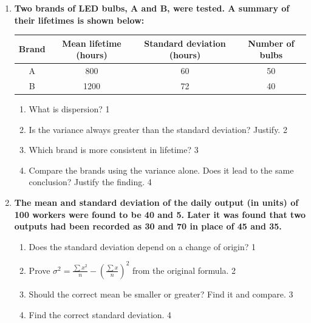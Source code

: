 \documentclass[a4paper,oneside]{book}
\begin{document}
\begin{enumerate}
  \begin{enumerate}
    \item  
	Find Mean Deviation about mean and median of the footballer A.  \hfill 3
    \item
	Which footballer should be hired a club? Determine with the help of a suitable relative measure of dispersion. \hfill 4
\end{enumerate}

\item
\textbf{Two brands of LED bulbs, A and B, were tested. A summary of their lifetimes is shown below:}
\begin{center}
\begin{tabular}{c|c|c|c}
Brand & Mean lifetime (hours) & Standard deviation (hours) & Number of bulbs \\ \hline
A & 800 & 60 & 50 \\
B & 1200 & 72 & 40
\end{tabular}
\end{center}
\begin{enumerate}
  \item What is dispersion? \hfill 1
  \item Is the variance always greater than the standard deviation? Justify. \hfill 2
  \item Which brand is more consistent in lifetime? \hfill 3
  \item Compare the brands using the variance alone. Does it lead to the same conclusion? Justify the finding. \hfill 4
\end{enumerate}

\item
\textbf{The mean and standard deviation of the daily output (in units) of 100 workers were found to be 40 and 5. Later it was found that two outputs had been recorded as 30 and 70 in place of 45 and 35.}

\begin{enumerate}
  \item Does the standard deviation depend on a change of origin? \hfill 1
  \item Prove $\displaystyle \sigma^2 = \frac{\sum x^2}{n} - \left(\frac{\sum x}{n}\right)^2$ from the original formula. \hfill 2
  \item Should the correct mean be smaller or greater? Find it and compare. \hfill 3
  \item Find the correct standard deviation. \hfill 4
\end{enumerate}

\end{enumerate}
\end{document}
